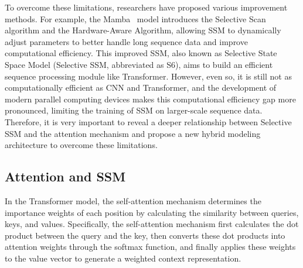 \documentclass{article}
\theoremstyle{plain}
\theoremstyle{definition}
\theoremstyle{remark}
\begin{document}

To overcome these limitations, researchers have proposed various improvement methods. For example, the Mamba~\cite{gu2023mamba} model introduces the Selective Scan algorithm and the Hardware-Aware Algorithm, allowing SSM to dynamically adjust parameters to better handle long sequence data and improve computational efficiency. This improved SSM, also known as Selective State Space Model (Selective SSM, abbreviated as S6), aims to build an efficient sequence processing module like Transformer. However, even so, it is still not as computationally efficient as CNN and Transformer, and the development of modern parallel computing devices makes this computational efficiency gap more pronounced, limiting the training of SSM on larger-scale sequence data. Therefore, it is very important to reveal a deeper relationship between Selective SSM and the attention mechanism and propose a new hybrid modeling architecture to overcome these limitations.



\subsection{Attention and SSM}
In the Transformer model, the self-attention mechanism determines the importance weights of each position by calculating the similarity between queries, keys, and values. Specifically, the self-attention mechanism first calculates the dot product between the query and the key, then converts these dot products into attention weights through the softmax function, and finally applies these weights to the value vector to generate a weighted context representation.
\end{document}
